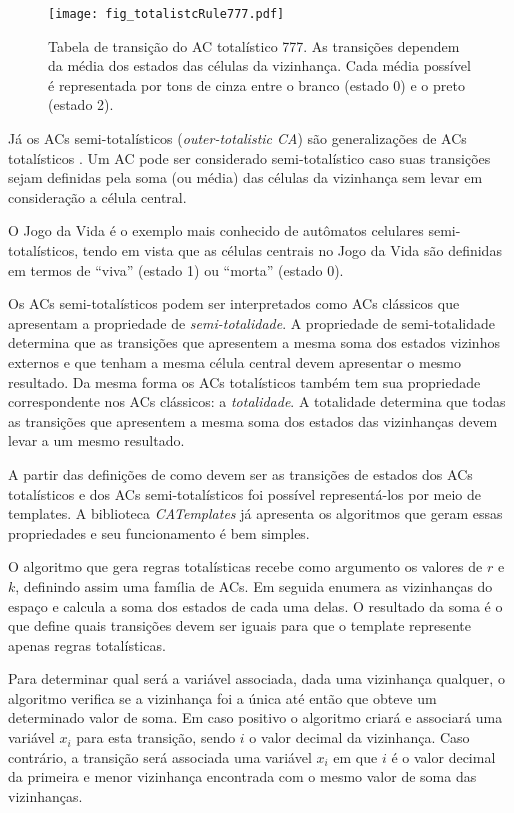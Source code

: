 	\begin{figure}[h!]
	  \centering
	  \texttt{[image: fig\_totalistcRule777.pdf]}
	  \caption{Tabela de transição do AC totalístico 777. As transições dependem da média dos estados das células da vizinhança. Cada média possível é representada por tons de cinza entre o branco (estado 0) e o preto (estado 2).}
	  \label{fig:totalistcRule}
	\end{figure}

Já os ACs semi-totalísticos (\textit{outer-totalistic CA}) são generalizações de ACs totalísticos \cite{weisstein2015outerTotalistic}. Um AC pode ser considerado semi-totalístico caso suas transições sejam definidas pela soma (ou média) das células da vizinhança sem levar em consideração a célula central.

O Jogo da Vida \cite{GardnerM1970} é o exemplo mais conhecido de autômatos celulares semi-totalísticos, tendo em vista que as células centrais no Jogo da Vida são definidas em termos de ``viva'' (estado 1) ou ``morta'' (estado 0).

Os ACs semi-totalísticos podem ser interpretados como ACs clássicos que apresentam a propriedade de \textit{semi-totalidade}. A propriedade de semi-totalidade determina que as transições que apresentem a mesma soma dos estados vizinhos externos e que tenham a mesma célula central devem apresentar o mesmo resultado. Da mesma forma os ACs totalísticos também tem sua propriedade correspondente nos ACs clássicos: a \textit{totalidade}. A totalidade determina que todas as transições que apresentem a mesma soma dos estados das vizinhanças devem levar a um mesmo resultado.

A partir das definições de como devem ser as transições de estados dos ACs totalísticos e dos ACs semi-totalísticos foi possível representá-los por meio de templates. A biblioteca \textit{CATemplates} já apresenta os algoritmos que geram essas propriedades e seu funcionamento é bem simples. 

O algoritmo que gera regras totalísticas recebe como argumento os valores de $r$ e $k$, definindo assim uma família de ACs. Em seguida enumera as vizinhanças do espaço e calcula a soma dos estados de cada uma delas. O resultado da soma é o que define quais transições devem ser iguais para que o template represente apenas regras totalísticas.

Para determinar qual será a variável associada, dada uma vizinhança qualquer, o algoritmo verifica se a vizinhança foi a única até então que obteve um determinado valor de soma. Em caso positivo o algoritmo criará e associará uma variável $x_i$ para esta transição, sendo $i$ o valor decimal da vizinhança. Caso contrário, a transição será associada uma variável $x_i$ em que $i$ é o valor decimal da primeira e menor vizinhança encontrada com o mesmo valor de soma das vizinhanças.

